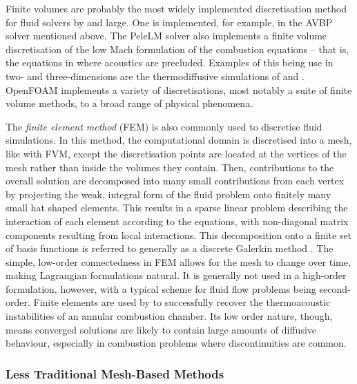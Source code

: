 Finite volumes are probably the most widely implemented discretisation method for fluid solvers by and large. One is implemented, for example, in the AVBP solver mentioned above. The PeleLM solver \cite{amrex-combustionPeleLM} also implements a finite volume discretisation of the low Mach formulation of the combustion equations -- that is, the equations in  where acoustics are precluded. Examples of this being use in two- and three-dimensions are the thermodiffusive simulations of \cite{howarth2022EmpiricalCharacteristicScaling} and \cite{howarth2023ThermodiffusivelyUnstableLeanPremixed}. OpenFOAM \cite{opencfdltd2004OpenFOAM} implements a variety of discretisations, most notably a suite of finite volume methods, to a broad range of physical phenomena.

The \emph{finite element method} (FEM) is also commonly used to discretise fluid simulations. In this method, the computational domain is discretised into a mesh, like with FVM, except the discretisation points are located at the vertices of the mesh rather than inside the volumes they contain. Then, contributions to the overall solution are decomposed into many small contributions from each vertex by projecting the weak, integral form of the fluid problem onto finitely many small hat shaped elements. This results in a sparse linear problem describing the interaction of each element according to the equations, with non-diagonal matrix components resulting from local interactions. This decomposition onto a finite set of basis functions is referred to generally as a discrete Galerkin method \cite{zienkiewicz20051StandardDiscrete}. The simple, low-order connectedness in FEM allows for the mesh to change over time, making Lagrangian formulations natural. It is generally not used in a high-order formulation, however, with a typical scheme for fluid flow problems being second-order. Finite elements are used by \cite{camporeale2010FiniteElementMethod} to successfully recover the thermoacoustic instabilities of an annular combustion chamber. Its low order nature, though, means converged solutions are likely to contain large amounts of diffusive behaviour, especially in combustion problems where discontinuities are common.



\subsubsection{Less Traditional Mesh-Based Methods}

